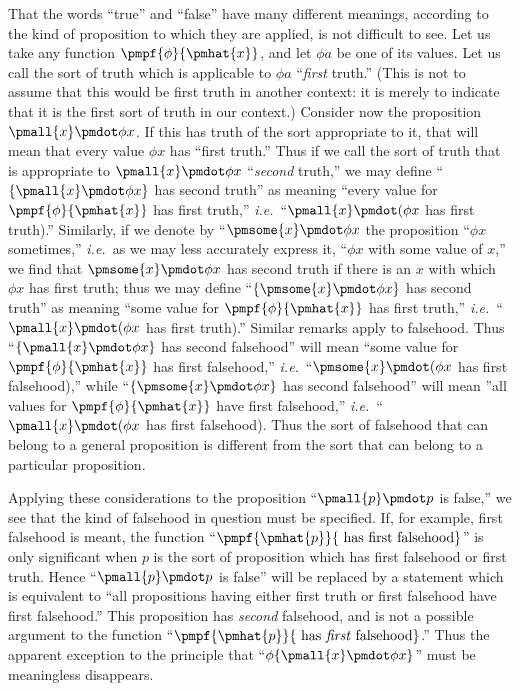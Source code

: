 \documentclass[letterpaper,12pt,openany,leqno]{book}
\newcommand{\pagefirst}[1]{\marginnote[\boxed{\text{#1}}]{\boxed{\text{#1}}}}
\begin{document}
That the words ``true'' and ``false'' have many different meanings, according to the kind of proposition to which they are applied, is not difficult to see. Let us take any function $\pmpf{\phi}{\pmhat{x}}$, and let $\phi a$ be one of its values. Let us call the sort of truth which is applicable to $\phi a$ ``\textit{first} truth.'' (This is not to assume that this would be first truth in another context: it is merely to indicate that it is the first sort of truth in our context.) Consider now the proposition $\pmall{x}\pmdot\phi x$. If this has truth of the sort appropriate to it, that will mean that every value $\phi x$ has ``first truth.'' Thus if we call the sort of truth that is appropriate to $\pmall{x}\pmdot\phi x$ ``\textit{second} truth,'' we may define ``$\{\pmall{x}\pmdot\phi x\}$ has second truth'' as meaning ``every value for $\pmpf{\phi}{\pmhat{x}}$ has first truth,'' \textit{i.e.}\ ``$\pmall{x}\pmdot(\phi x$ has first truth).'' Similarly, if we denote by ``$\pmsome{x}\pmdot\phi x$ the proposition ``$\phi x$ sometimes,'' \textit{i.e.}\ as we may less accurately express it, ``$\phi x$ with some value of $x$,'' we find that $\pmsome{x}\pmdot\phi x$ has second truth if there is an $x$ with \pagefirst{45} which $\phi x$ has first truth; thus we may define ``$\{\pmsome{x}\pmdot\phi x\}$ has second truth'' as meaning ``some value for $\pmpf{\phi}{\pmhat{x}}$ has first truth,'' \textit{i.e.}\ ``$\pmall{x}\pmdot(\phi x$ has first truth).'' Similar remarks apply to falsehood. Thus ``$\{\pmall{x}\pmdot\phi x\}$ has second falsehood'' will mean ``some value for $\pmpf{\phi}{\pmhat{x}}$ has first falsehood,'' \textit{i.e.}\ ``$\pmsome{x}\pmdot(\phi x$ has first falsehood),'' while ``$\{\pmsome{x}\pmdot\phi x\}$ has second falsehood'' will mean ''all values for $\pmpf{\phi}{\pmhat{x}}$ have first falsehood,'' \textit{i.e.}\ ``$\pmall{x}\pmdot(\phi x$ has first falsehood). Thus the sort of falsehood that can belong to a general proposition is different from the sort that can belong to a particular proposition.

Applying these considerations to the proposition ``$\pmall{p}\pmdot p$ is false,'' we see that the kind of falsehood in question must be specified. If, for example, first falsehood is meant, the function ``$\pmpf{\pmhat{p}}{\text{ has first falsehood}}$'' is only significant when $p$ is the sort of proposition which has first falsehood or first truth. Hence ``$\pmall{p}\pmdot p$ is false'' will be replaced by a statement which is equivalent to ``all propositions having either first truth or first falsehood have first falsehood.'' This proposition has \textit{second} falsehood, and is not a possible argument to the function ``$\pmpf{\pmhat{p}}{\text{ has \textit{first} falsehood}}$.'' Thus the apparent exception to the principle that ``$\phi\{\pmall{x}\pmdot\phi x\}$'' must be meaningless disappears.
\end{document}
